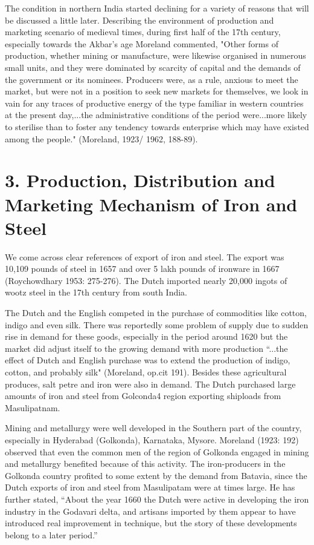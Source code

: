 The condition in northern India started declining for a variety of reasons that will be discussed a little later. Describing the environment of production and marketing scenario of medieval times, during first half of the 17th century, especially towards the Akbar's age Moreland commented, "Other forms of production, whether mining or manufacture, were likewise organised in numerous small units, and they were dominated by scarcity of capital and the demands of the government or its nominees. Producers were, as a rule, anxious to meet the market, but were not in a position to seek new markets for themselves, we look in vain for any traces of productive energy of the type familiar in western countries at the present day,...the administrative conditions of the period were...more likely to sterilise than to foster any tendency towards enterprise which may have existed among the people." (Moreland, 1923/ 1962, 188-89).


\section*{3. Production, Distribution and Marketing Mechanism of Iron and Steel}

We come across clear references of export of iron and steel. The export was 10,109 pounds of steel in 1657 and over 5 lakh pounds of ironware in 1667 (Roychowdhary 1953: 275-276). The Dutch imported nearly 20,000 ingots of wootz steel in the 17th century from south India.

The Dutch and the English competed in the purchase of commodities like cotton, indigo and even silk. There was reportedly some problem of supply due to sudden rise in demand for these goods, especially in the period around 1620 but the market did adjust itself to the growing demand with more production ``...the effect of Dutch and English purchase was to extend the production of indigo, cotton, and probably silk" (Moreland, op.cit 191). Besides these agricultural produces, salt petre and iron were also in demand. The Dutch purchased large amounts of iron and steel from Golconda4 region exporting shiploads from Masulipatnam.

Mining and metallurgy were well developed in the Southern part of the country, especially in Hyderabad (Golkonda), Karnataka, Mysore. Moreland (1923: 192) observed that even the common men of the region of Golkonda engaged in mining and metallurgy benefited because of this activity. The iron-producers in the Golkonda country profited to some extent by the demand from Batavia, since the Dutch exports of iron and steel from Masulipatam were at times large. He has further stated, ``About the year 1660 the Dutch were active in developing the iron industry in the Godavari delta, and artisans imported by them appear to have introduced real improvement in technique, but the story of these developments belong to a later period.''

